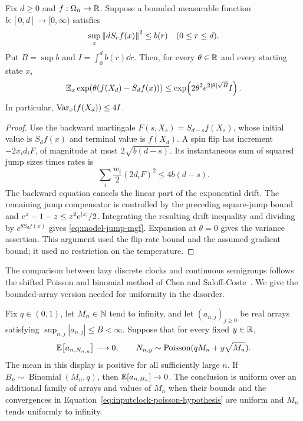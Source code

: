 \begin{lemma}
\label{lem:input-mgf}
Fix \(d\geq0\) and \(f:\Omega_n\to\mathbb R\).
Suppose a bounded measurable function \(b:[0,d]\to[0,\infty)\) satisfies
\[
 \sup_x\left\lVert dS_r f(x)\right\rVert^2\leq b(r)\quad(0\leq r\leq d).
\]
Put \(B=\sup b\) and \(I=\int_0^d b(r)\dd r\).  Then, for every
\(\theta\in\mathbb R\) and every starting state \(x\),
\begin{equation}
 \mathbb E_x\exp\!\left(\theta(f(X_d)-S_df(x))\right)
 \leq \exp\!\left(2\theta^2 e^{2\left\lvert \theta\right\rvert\sqrt B}I\right).
 \label{eq:model-jump-mgf}
\end{equation}
In particular, \(\operatorname{Var}_x(f(X_d))\leq4I\).
\end{lemma}

\begin{proof}
Use the backward martingale \(F(s,X_s)=S_{d-s}f(X_s)\), whose initial
value is \(S_df(x)\) and terminal value is \(f(X_d)\).  A spin flip
has increment \(-2x_i d_iF\), of magnitude at most
\(2\sqrt{b(d-s)}\).  Its instantaneous sum of squared jump sizes
times rates is
\[
 \sum_i\frac{w_i}{2}(2d_iF)^2\leq4b(d-s).
\]
The backward equation cancels the linear part of the exponential
drift.  The remaining jump compensator is controlled by the preceding
square-jump bound and \(e^z-1-z\leq z^2e^{\left\lvert z\right\rvert}/2\).  Integrating the
resulting drift inequality and dividing by \(e^{\theta S_df(x)}\)
gives \eqref{eq:model-jump-mgf}.  Expansion at \(\theta=0\) gives the
variance assertion.  This argument used the flip-rate bound and the
assumed gradient bound; it used no restriction on the temperature.
\end{proof}

The comparison between lazy discrete clocks and continuous semigroups
follows the shifted Poisson and binomial method of Chen and
Saloff-Coste~\cite[Theorem~1.1 and Lemmas~3.1--3.2]{ChenSaloffCoste2013}.
We give the bounded-array version needed for uniformity in the disorder.
\begin{lemma}
\label{lem:input-clock}
Fix $q\in(0,1)$, let $M_n\in\mathbb N$ tend to infinity, and let
$(a_{n,j})_{j\ge0}$ be real arrays satisfying
$\sup_{n,j}|a_{n,j}|\le B<\infty$.  Suppose that for every fixed
$y\in\mathbb R$,
\begin{equation}
 \mathbb E\bigl[a_{n,N_{n,y}}\bigr]\longrightarrow0,
 \qquad
 N_{n,y}\sim\operatorname{Poisson}
                   (q M_n+y\sqrt{M_n}).
 \label{eq:inputclock-poisson-hypothesis}
\end{equation}
The mean in this display is positive for all sufficiently large $n$.
If $B_n\sim\operatorname{Binomial}(M_n,q)$, then
$\mathbb E[a_{n,B_n}]\to0$.
The conclusion is uniform over an additional family of arrays and
values of $M_n$ when their bounds and the convergences in
Equation~\eqref{eq:inputclock-poisson-hypothesis} are uniform and $M_n$
tends uniformly to infinity.
\end{lemma}

